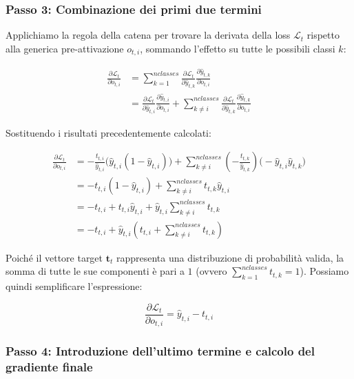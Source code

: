 ﻿\documentclass[11pt, a4paper]{article}
\begin{document}
\newpage

\subsubsection{Passo 3: Combinazione dei primi due termini}

Applichiamo la regola della catena per trovare la derivata della loss $\mathcal{L}_t$ rispetto alla generica pre-attivazione $o_{t,i}$, sommando l'effetto su tutte le possibili classi $k$:

\begin{align*}
\frac{\partial \mathcal{L}_t}{\partial o_{t,i}} &= \sum_{k=1}^{nclasses} \frac{\partial \mathcal{L}_t}{\partial \hat{y}_{t,k}} \frac{\partial \hat{y}_{t,k}}{\partial o_{t,i}} \\
&= \frac{\partial \mathcal{L}_t}{\partial \hat{y}_{t,i}} \frac{\partial \hat{y}_{t,i}}{\partial o_{t,i}} + \sum_{k \neq i}^{nclasses} \frac{\partial \mathcal{L}_t}{\partial \hat{y}_{t,k}} \frac{\partial \hat{y}_{t,k}}{\partial o_{t,i}}
\end{align*}

Sostituendo i risultati precedentemente calcolati:

\begin{align*}
\frac{\partial \mathcal{L}_t}{\partial o_{t,i}} &= -\frac{t_{t,i}}{\hat{y}_{t,i}} \big(\hat{y}_{t,i}(1 - \hat{y}_{t,i})\big) + \sum_{k \neq i}^{nclasses} \left(-\frac{t_{t,k}}{\hat{y}_{t,k}}\right) \big(-\hat{y}_{t,i}\hat{y}_{t,k}\big) \\
&= -t_{t,i}(1 - \hat{y}_{t,i}) + \sum_{k \neq i}^{nclasses} t_{t,k} \hat{y}_{t,i} \\
&= -t_{t,i} + t_{t,i}\hat{y}_{t,i} + \hat{y}_{t,i}\sum_{k \neq i}^{nclasses} t_{t,k} \\
&= -t_{t,i} + \hat{y}_{t,i} \left( t_{t,i} + \sum_{k \neq i}^{nclasses} t_{t,k} \right)
\end{align*}

Poiché il vettore target $\bm{t}_t$ rappresenta una distribuzione di probabilità valida, la somma di tutte le sue componenti è pari a $1$ (ovvero $\sum_{k=1}^{nclasses} t_{t,k} = 1$). Possiamo quindi semplificare l'espressione:

\[
\frac{\partial \mathcal{L}_t}{\partial o_{t,i}} = \hat{y}_{t,i} - t_{t,i}
\]

\subsubsection{Passo 4: Introduzione dell'ultimo termine e calcolo del gradiente finale}
\end{document}
